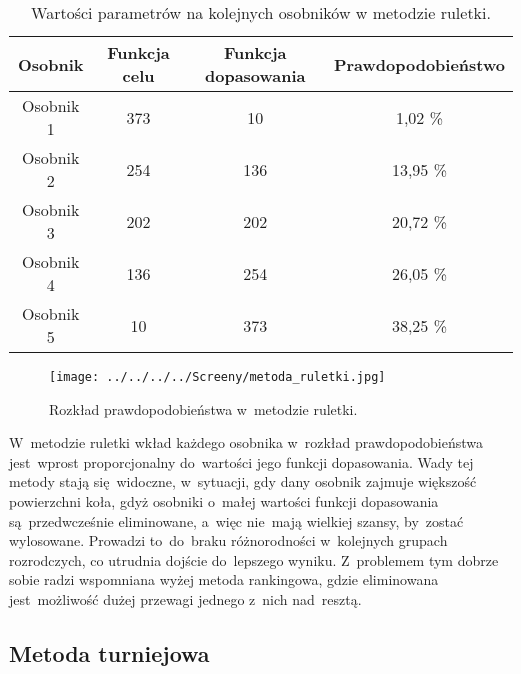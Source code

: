 \begin{table}[h!]
\begin{center}
\caption{Wartości parametrów na kolejnych osobników w metodzie ruletki.}
\begin{tabular}{|c|c|c|c|}
\hline
\textbf{Osobnik}  & \textbf{Funkcja celu} & \textbf{Funkcja dopasowania} & \textbf{Prawdopodobieństwo}\\
\hline
Osobnik 1 & 373 & 10 & 1,02  \% \\
\hline
Osobnik 2 &254 & 136  & 13,95  \% \\
\hline
Osobnik 3 & 202 & 202 & 20,72  \% \\
\hline
Osobnik 4 & 136 & 254 & 26,05  \% \\
\hline
Osobnik 5 & 10 & 373 & 38,25  \% \\
\hline
\end{tabular}
\end{center}
\end{table}

\vspace{0,4cm}

\begin{figure}[h]
		\texttt{[image: ../../../../Screeny/metoda\_ruletki.jpg]}
		\caption{Rozkład prawdopodobieństwa w~metodzie ruletki.}
		\label{ruletka}			
\end{figure}
\par
W~metodzie ruletki wkład każdego osobnika w~rozkład prawdopodobieństwa jest~wprost proporcjonalny do~wartości jego funkcji dopasowania. Wady tej metody stają się~widoczne, w~sytuacji, gdy dany osobnik zajmuje większość powierzchni koła, gdyż osobniki o~małej wartości funkcji dopasowania są~przedwcześnie eliminowane, a~więc nie~mają wielkiej szansy, by~zostać wylosowane. Prowadzi to~do~braku różnorodności w~kolejnych grupach rozrodczych, co utrudnia dojście do~lepszego wyniku. Z~problemem tym dobrze sobie radzi wspomniana wyżej metoda rankingowa, gdzie eliminowana jest~możliwość dużej przewagi jednego z~nich nad~resztą.\\

\subsection{Metoda turniejowa}\label{sec:narzedzia}


